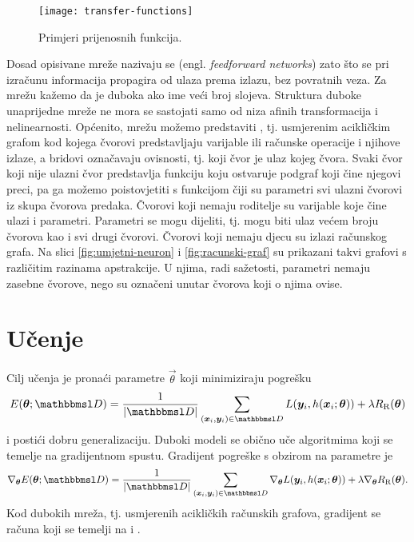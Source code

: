 \documentclass[utf8, diplomski, lmodern]{fer}
\begin{document}
\begin{figure}
	\centering
	\texttt{[image: transfer-functions]}
	\caption[s]{Primjeri prijenosnih funkcija.}
	\label{fig:prijenosne-funkcije}
\end{figure}

Dosad opisivane mreže nazivaju se  (engl. \textit{feedforward networks}) zato što se pri izračunu informacija propagira od ulaza prema izlazu, bez povratnih veza. Za mrežu kažemo da je duboka ako ime veći broj slojeva. Struktura duboke unaprijedne mreže ne mora se sastojati samo od niza afinih transformacija i nelinearnosti. Općenito, mrežu možemo predstaviti , tj. usmjerenim acikličkim grafom kod kojega čvorovi predstavljaju varijable ili računske operacije i njihove izlaze, a bridovi označavaju ovisnosti, tj. koji čvor je ulaz kojeg čvora. Svaki čvor koji nije ulazni čvor predstavlja funkciju koju ostvaruje podgraf koji čine njegovi preci, pa ga možemo poistovjetiti s funkcijom čiji su parametri svi ulazni čvorovi iz skupa čvorova predaka. Čvorovi koji nemaju roditelje su varijable koje čine ulazi i parametri. Parametri se mogu dijeliti, tj. mogu biti ulaz većem broju čvorova kao i svi drugi čvorovi. Čvorovi koji nemaju djecu su izlazi računskog grafa. Na slici \ref{fig:umjetni-neuron} i \ref{fig:racunski-graf} su prikazani takvi grafovi s različitim razinama apstrakcije. U njima, radi sažetosti, parametri nemaju zasebne čvorove, nego su označeni unutar čvorova koji o njima ovise.

\section{Učenje} \label{sec:du-ucenje}

Cilj učenja je pronaći parametre $\vec\theta$ koji minimiziraju pogrešku
\begin{align}
E(\vec\theta;\set D) = \frac{1}{\envert{\set D}}\sum_{(\vec x_i,\vec y_i)\in\set D} L(\vec y_i,h(\vec x_i;\vec\theta)) + \lambda R_\text{R}(\vec\theta)
\end{align}
i postići dobru generalizaciju. Duboki modeli se obično uče algoritmima koji se temelje na gradijentnom spustu. Gradijent pogreške s obzirom na parametre je
\begin{align} \label{eq:gs-ucenje}
\nabla_{\vec\theta}E(\vec\theta;\set D) = \frac{1}{\envert{\set D}}\sum_{(\vec x_i,\vec y_i)\in\set D} \nabla_{\vec\theta}L(\vec y_i,h(\vec x_i;\vec\theta)) + \lambda \nabla_{\vec\theta}R_\text{R}(\vec\theta) \text{.}
\end{align}
Kod dubokih mreža, tj. usmjerenih acikličkih računskih grafova, gradijent se računa  \citep{Rumelhart:1986:LIREP} koji se temelji na  i . 
\end{document}
